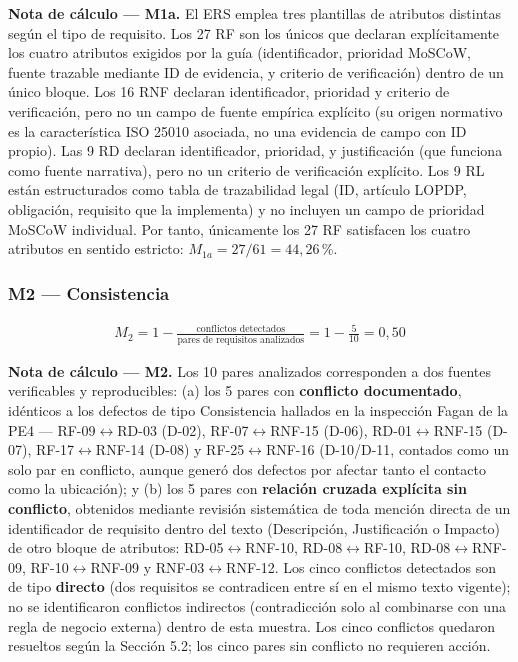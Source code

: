 \documentclass[11pt]{article}
\begin{document}
	\textbf{Nota de cálculo --- M1a.} El ERS emplea tres plantillas de atributos distintas según el tipo de requisito. Los 27 RF son los únicos que declaran explícitamente los cuatro atributos exigidos por la guía (identificador, prioridad MoSCoW, fuente trazable mediante ID de evidencia, y criterio de verificación) dentro de un único bloque. Los 16 RNF declaran identificador, prioridad y criterio de verificación, pero no un campo de fuente empírica explícito (su origen normativo es la característica ISO 25010 asociada, no una evidencia de campo con ID propio). Las 9 RD declaran identificador, prioridad, y justificación (que funciona como fuente narrativa), pero no un criterio de verificación explícito. Los 9 RL están estructurados como tabla de trazabilidad legal (ID, artículo LOPDP, obligación, requisito que la implementa) y no incluyen un campo de prioridad MoSCoW individual. Por tanto, únicamente los 27 RF satisfacen los cuatro atributos en sentido estricto: $M_{1a} = 27/61 = 44{,}26\,\%$.
	
	\subsubsection*{M2 --- Consistencia}
	
	{\setlength{\jot}{8pt}
		\begin{align*}
			M_2 = 1 - \frac{\text{conflictos detectados}}{\text{pares de requisitos analizados}} = 1 - \frac{5}{10} = 0{,}50
	\end{align*}}
	
	\textbf{Nota de cálculo --- M2.} Los 10 pares analizados corresponden a dos fuentes verificables y reproducibles: (a) los 5 pares con \textbf{conflicto documentado}, idénticos a los defectos de tipo Consistencia hallados en la inspección Fagan de la PE4 --- RF-09$\leftrightarrow$RD-03 (D-02), RF-07$\leftrightarrow$RNF-15 (D-06), RD-01$\leftrightarrow$RNF-15 (D-07), RF-17$\leftrightarrow$RNF-14 (D-08) y RF-25$\leftrightarrow$RNF-16 (D-10/D-11, contados como un solo par en conflicto, aunque generó dos defectos por afectar tanto el contacto como la ubicación); y (b) los 5 pares con \textbf{relación cruzada explícita sin conflicto}, obtenidos mediante revisión sistemática de toda mención directa de un identificador de requisito dentro del texto (Descripción, Justificación o Impacto) de otro bloque de atributos: RD-05$\leftrightarrow$RNF-10, RD-08$\leftrightarrow$RF-10, RD-08$\leftrightarrow$RNF-09, RF-10$\leftrightarrow$RNF-09 y RNF-03$\leftrightarrow$RNF-12. Los cinco conflictos detectados son de tipo \textbf{directo} (dos requisitos se contradicen entre sí en el mismo texto vigente); no se identificaron conflictos indirectos (contradicción solo al combinarse con una regla de negocio externa) dentro de esta muestra. Los cinco conflictos quedaron resueltos según la Sección 5.2; los cinco pares sin conflicto no requieren acción.
	
\end{document}
